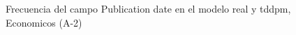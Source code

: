 \begin{figure}[H]
    \centering
    
    \caption{Frecuencia del campo Publication date en el modelo real y tddpm, Economicos (A-2)}
    \label{frecuency-Publication Date-tddpm_mlp}
\end{figure}